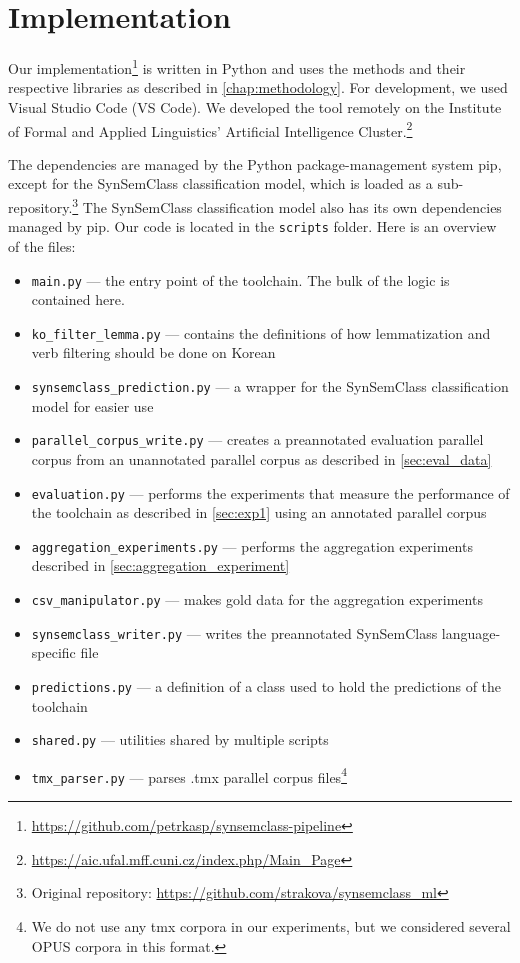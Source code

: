 \chapter{Implementation}
\label{implementation}

Our implementation\footnote{\url{https://github.com/petrkasp/synsemclass-pipeline}} is written in Python and uses the methods and their respective libraries as described in \cref{chap:methodology}. For development, we used Visual Studio Code (VS Code). We developed the tool remotely on the Institute of Formal and Applied Linguistics' Artificial Intelligence Cluster.\footnote{\url{https://aic.ufal.mff.cuni.cz/index.php/Main_Page}}

The dependencies are managed by the Python package-management system pip, except for the SynSemClass classification model, which is loaded as a sub-repository.\footnote{Original repository: \url{https://github.com/strakova/synsemclass_ml}} The SynSemClass classification model also has its own dependencies managed by pip. Our code is located in the \texttt{scripts} folder. Here is an overview of the files:

\overfullrule=0pt

\begin{itemize}
    \item \texttt{main.py} --- the entry point of the toolchain. The bulk of the logic is contained here.
    \item \texttt{ko\_filter\_lemma.py} --- contains the definitions of how lemmatization and verb filtering should be done on Korean
    \item \texttt{synsemclass\_prediction.py} --- a wrapper for the SynSemClass classification model for easier use
    \item \texttt{parallel\_corpus\_write.py} --- creates a preannotated evaluation parallel corpus from an unannotated parallel corpus as described in \cref{sec:eval_data}
    \item \texttt{evaluation.py} --- performs the experiments that measure the performance of the toolchain as described in \cref{sec:exp1} using an annotated parallel corpus
    \item \texttt{aggregation\_experiments.py} --- performs the aggregation experiments described in \cref{sec:aggregation_experiment}
    \item \texttt{csv\_manipulator.py} --- makes gold data for the aggregation experiments
    \item \texttt{synsemclass\_writer.py} --- writes the preannotated SynSemClass language-specific file
    \item \texttt{predictions.py} --- a definition of a class used to hold the predictions of the toolchain
    \item \texttt{shared.py} --- utilities shared by multiple scripts
    \item \texttt{tmx\_parser.py} --- parses .tmx parallel corpus files\footnote{We do not use any tmx corpora in our experiments, but we considered several OPUS corpora in this format.}
\end{itemize}

